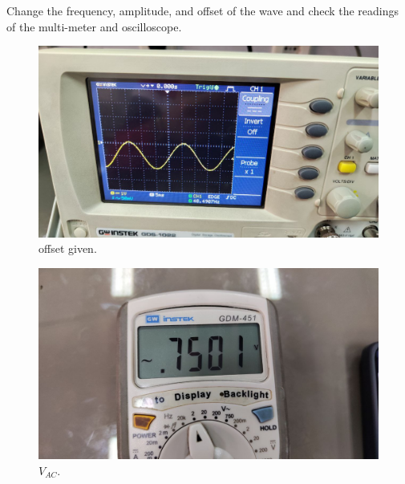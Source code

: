 \documentclass[11pt]{article}
\newcommand{\PicScale}{0.2}
\begin{document}
\begin{question}
\begin{subquestion}{Change the frequency, amplitude, and offset of the wave and check the readings of the multi-meter and oscilloscope.}
{    \begin{figure}[H]
        \begin{center}
            \includegraphics[scale=\PicScale]{Fig/27.jpeg}
            \caption{offset given.}
        \end{center}
    \end{figure}
    \begin{figure}[H]
        \begin{center}
            \includegraphics[scale=\PicScale]{Fig/28.jpeg}
            \caption{$V_{AC}$.}
        \end{center}
    \end{figure}

}
\end{subquestion}
\end{question}
\end{document}
